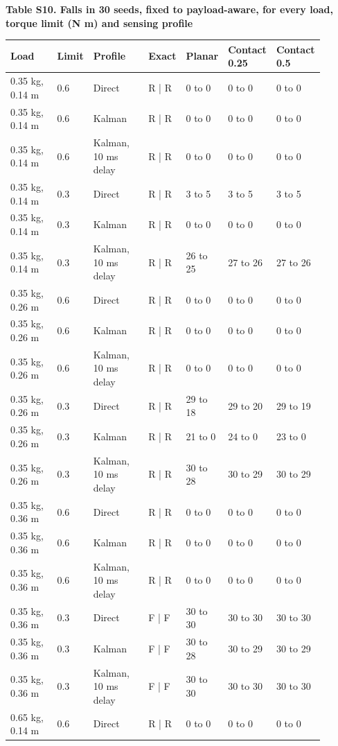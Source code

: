 \documentclass[11pt,a4paper]{article}
\begin{document}
\textbf{Table S10. Falls in 30 seeds, fixed to payload-aware, for every load, torque limit (N m) and sensing profile}
\begin{longtable}{p{0.171\linewidth}p{0.072\linewidth}p{0.198\linewidth}p{0.072\linewidth}p{0.126\linewidth}p{0.131\linewidth}p{0.131\linewidth}}
\toprule
Load & Limit & Profile & Exact & Planar & Contact 0.25 & Contact 0.5 \\ \midrule \endhead
0.35 kg, 0.14 m & 0.6 & Direct & R | R & 0 to 0 & 0 to 0 & 0 to 0 \\
0.35 kg, 0.14 m & 0.6 & Kalman & R | R & 0 to 0 & 0 to 0 & 0 to 0 \\
0.35 kg, 0.14 m & 0.6 & Kalman, 10 ms delay & R | R & 0 to 0 & 0 to 0 & 0 to 0 \\
0.35 kg, 0.14 m & 0.3 & Direct & R | R & 3 to 5 & 3 to 5 & 3 to 5 \\
0.35 kg, 0.14 m & 0.3 & Kalman & R | R & 0 to 0 & 0 to 0 & 0 to 0 \\
0.35 kg, 0.14 m & 0.3 & Kalman, 10 ms delay & R | R & 26 to 25 & 27 to 26 & 27 to 26 \\
0.35 kg, 0.26 m & 0.6 & Direct & R | R & 0 to 0 & 0 to 0 & 0 to 0 \\
0.35 kg, 0.26 m & 0.6 & Kalman & R | R & 0 to 0 & 0 to 0 & 0 to 0 \\
0.35 kg, 0.26 m & 0.6 & Kalman, 10 ms delay & R | R & 0 to 0 & 0 to 0 & 0 to 0 \\
0.35 kg, 0.26 m & 0.3 & Direct & R | R & 29 to 18 & 29 to 20 & 29 to 19 \\
0.35 kg, 0.26 m & 0.3 & Kalman & R | R & 21 to 0 & 24 to 0 & 23 to 0 \\
0.35 kg, 0.26 m & 0.3 & Kalman, 10 ms delay & R | R & 30 to 28 & 30 to 29 & 30 to 29 \\
0.35 kg, 0.36 m & 0.6 & Direct & R | R & 0 to 0 & 0 to 0 & 0 to 0 \\
0.35 kg, 0.36 m & 0.6 & Kalman & R | R & 0 to 0 & 0 to 0 & 0 to 0 \\
0.35 kg, 0.36 m & 0.6 & Kalman, 10 ms delay & R | R & 0 to 0 & 0 to 0 & 0 to 0 \\
0.35 kg, 0.36 m & 0.3 & Direct & F | F & 30 to 30 & 30 to 30 & 30 to 30 \\
0.35 kg, 0.36 m & 0.3 & Kalman & F | F & 30 to 28 & 30 to 29 & 30 to 29 \\
0.35 kg, 0.36 m & 0.3 & Kalman, 10 ms delay & F | F & 30 to 30 & 30 to 30 & 30 to 30 \\
0.65 kg, 0.14 m & 0.6 & Direct & R | R & 0 to 0 & 0 to 0 & 0 to 0 \\

\end{longtable}
\end{document}
